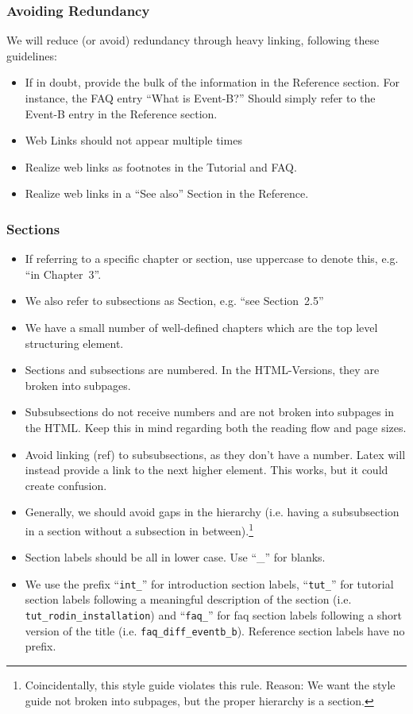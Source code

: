 \subsubsection{Avoiding Redundancy}

We will reduce (or avoid) redundancy through heavy linking, following these guidelines:

\begin{itemize}
	\item If in doubt, provide the bulk of the information in the Reference section.  For instance, the FAQ entry ``What is Event-B?''  Should simply refer to the Event-B entry in the Reference section.
	\item Web Links should not appear multiple times
	\item Realize web links as footnotes in the Tutorial and FAQ.
	\item Realize web links in a ``See also'' Section in the Reference.
\end{itemize}

\subsubsection{Sections}

\begin{itemize}
	\item If referring to a specific chapter or section, use uppercase to denote this, e.g. ``in Chapter~3''.
	\item We also refer to subsections as Section, e.g. ``see Section~2.5''
	\item We have a small number of well-defined chapters which are the top level structuring element.
	\item Sections and subsections are numbered.  In the HTML-Versions, they are broken into subpages.
    \item Subsubsections do not receive numbers and are not broken into subpages in the HTML.  Keep this in mind regarding both the reading flow and page sizes.
	\item Avoid linking (ref) to subsubsections, as they don't have a number.  Latex will instead provide a link to the next higher element.  This works, but it could create confusion.
	\item Generally, we should avoid gaps in the hierarchy (i.e. having a subsubsection in a section without a subsection in between).\footnote{Coincidentally, this style guide violates this rule. Reason: We want the style guide not broken into subpages, but the proper hierarchy is a section.}
	\item Section labels should be all in lower case. Use ``\_'' for blanks.
	\item We use the prefix ``\texttt{int\_}'' for introduction section labels, ``\texttt{tut\_}'' for tutorial section labels following a meaningful description of the section (i.e. \texttt{tut\_rodin\_installation}) and ``\texttt{faq\_}'' for faq section labels following a short version of the title (i.e. \texttt{faq\_diff\_eventb\_b}). Reference section labels have no prefix.
\end{itemize}

